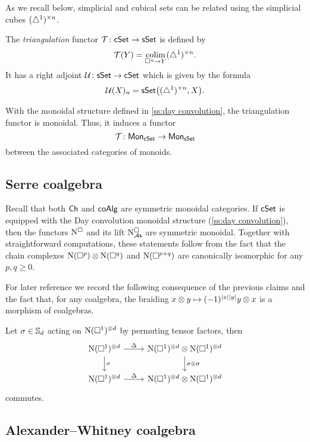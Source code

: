 As we recall below, simplicial and cubical sets can be related using the simplicial cubes $(\simplex^1)^{\times n}$.

The \textit{triangulation} functor $\mathcal{T} \colon \cSet \to \sSet$ is defined by
\[
\mathcal{T}(Y) = \colim_{\cube^n \to Y} (\simplex^1)^{\times n}.
\]
It has a right adjoint $\mathcal{U} \colon \sSet \to \cSet$ which is given by the formula
\[
\mathcal{U}(X)_n = \sSet \big( (\simplex^1)^{\times n}, X \big).
\]

With the monoidal structure defined in \cref{ss:day convolution}, the triangulation functor is monoidal.
Thus, it induces a functor
\[
\mathcal{T} \colon \Mon_{\cSet} \to \Mon_{\sSet}
\]
between the associated categories of monoids.

\subsection{Serre coalgebra} \label{ss:serre coalgebra sym monoidal}

Recall that both $\Ch$ and $\coAlg$ are symmetric monoidal categories.
If $\cSet$ is equipped with the Day convolution monoidal structure (\cref{ss:day convolution}), then the functors $\cchains$ and its lift $\cchainsAs$ are symmetric monoidal.
Together with straightforward computations, these statements follow from the fact that the chain complexes $\chains(\cube^p) \otimes \chains(\cube^q)$ and $\chains(\cube^{p+q})$ are canonically isomorphic for any $p, q \geq 0$.

For later reference we record the following consequence of the previous claims and the fact that, for any coalgebra, the braiding $x \otimes y \mapsto (-1)^{\bars{x} \bars{y}} y \otimes x$ is a morphism of coalgebras.

\begin{lemma} \label{l:serre diagonal invariant}
	Let $\sigma \in \S_d$ acting on $\chains(\cube^1)^{\otimes d}$ by permuting tensor factors, then
	\[
	\begin{tikzcd}
	\chains(\cube^1)^{\otimes d} \arrow[r, "\Delta"] \arrow[d, "\sigma"] &
	\chains(\cube^1)^{\otimes d} \otimes \chains(\cube^1)^{\otimes d} \arrow[d, "\sigma \otimes \sigma"] \\
	\chains(\cube^1)^{\otimes d} \arrow[r, "\Delta"] &
	\chains(\cube^1)^{\otimes d} \otimes \chains(\cube^1)^{\otimes d}
	\end{tikzcd}
	\]
	commutes.
\end{lemma}

\subsection{Alexander--Whitney coalgebra}

